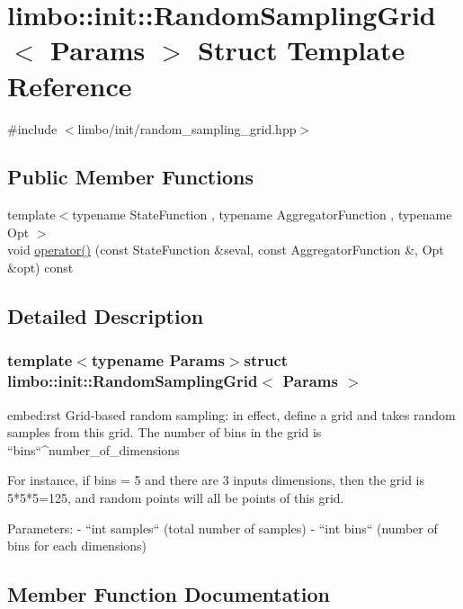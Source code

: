 \hypertarget{structlimbo_1_1init_1_1_random_sampling_grid}{}\section{limbo\+:\+:init\+:\+:Random\+Sampling\+Grid$<$ Params $>$ Struct Template Reference}
\label{structlimbo_1_1init_1_1_random_sampling_grid}


{\ttfamily \#include $<$limbo/init/random\+\_\+sampling\+\_\+grid.\+hpp$>$}

\subsection*{Public Member Functions}
\begin{DoxyCompactItemize}
\item 
{\footnotesize template$<$typename State\+Function , typename Aggregator\+Function , typename Opt $>$ }\\void \hyperlink{structlimbo_1_1init_1_1_random_sampling_grid_a6fd277031f69bf9da891b5f35065c369}{operator()} (const State\+Function \&seval, const Aggregator\+Function \&, Opt \&opt) const 
\end{DoxyCompactItemize}


\subsection{Detailed Description}
\subsubsection*{template$<$typename Params$>$struct limbo\+::init\+::\+Random\+Sampling\+Grid$<$ Params $>$}

\begin{DoxyVerb}embed:rst
Grid-based random sampling: in effect, define a grid and takes random samples from this grid. The number of bins in the grid is ``bins``^number_of_dimensions

For instance, if bins = 5 and there are 3 inputs dimensions, then the grid is 5*5*5=125, and random points will all be points of this grid.

Parameters:
  - ``int samples`` (total number of samples)
  - ``int bins`` (number of bins for each dimensions)
\end{DoxyVerb}
 

\subsection{Member Function Documentation}
\hypertarget{structlimbo_1_1init_1_1_random_sampling_grid_a6fd277031f69bf9da891b5f35065c369}{}
